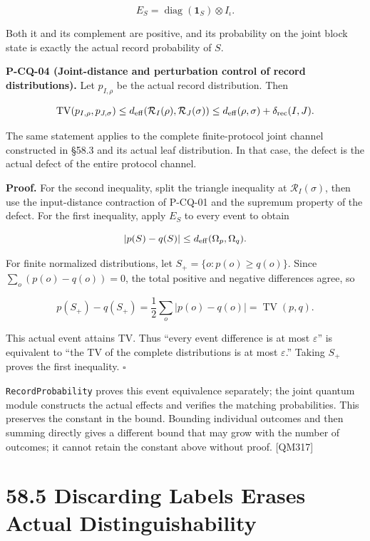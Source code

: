 \documentclass[
  11pt,
  oneside]{book}
\begin{document}
\[
E_S=\operatorname{diag}(\mathbf1_S)\otimes I_\iota.
\]

Both it and its complement are positive, and its probability on the
joint block state is exactly the actual record probability of \(S\).

\label{p-cq-04}{}

\textbf{P-CQ-04 (Joint-distance and perturbation control of record
distributions).} Let \(p_{I,\rho}\) be the actual record distribution.
Then

\[
\operatorname{TV}(p_{I,\rho},p_{J,\sigma})
\le d_{\rm eff}(\mathcal R_I(\rho),\mathcal R_J(\sigma))
\le d_{\rm eff}(\rho,\sigma)+\delta_{\rm rec}(I,J).
\]

The same statement applies to the complete finite-protocol joint channel
constructed in §58.3 and its actual leaf distribution. In that case, the
defect is the actual defect of the entire protocol channel.

\textbf{Proof.} For the second inequality, split the triangle inequality
at \(\mathcal R_I(\sigma)\), then use the input-distance contraction of
P-CQ-01 and the supremum property of the defect. For the first
inequality, apply \(E_S\) to every event to obtain

\[
|p(S)-q(S)|\le d_{\rm eff}(\Omega_p,\Omega_q).
\]

For finite normalized distributions, let \(S_+=\{o:p(o)\ge q(o)\}\).
Since \(\sum_o(p(o)-q(o))=0\), the total positive and negative
differences agree, so

\[
p(S_+)-q(S_+)=\frac12\sum_o|p(o)-q(o)|=\operatorname{TV}(p,q).
\]

This actual event attains TV. Thus ``every event difference is at most
\(\varepsilon\)'' is equivalent to ``the TV of the complete
distributions is at most \(\varepsilon\).'' Taking \(S_+\) proves the
first inequality. \(\square\)

\texttt{Record\allowbreak Probability} proves this event equivalence separately; the
joint quantum module constructs the actual effects and verifies the
matching probabilities. This preserves the constant in the bound.
Bounding individual outcomes and then summing directly gives a different
bound that may grow with the number of outcomes; it cannot retain the
constant above without proof. {[}QM317{]}

\section{58.5 Discarding Labels Erases Actual Distinguishability}
\end{document}
